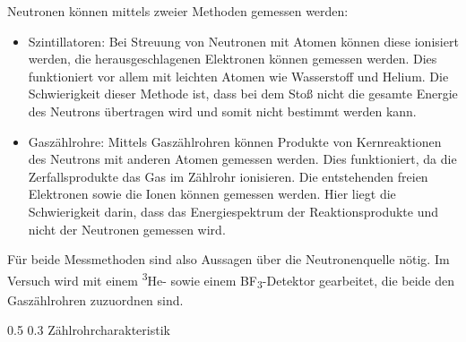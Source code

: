 \documentclass[german, %
parskip=full, %
bibliography=totoc, %
]{scrartcl}
\makeatletter
\renewcommand\subsection{\@startsection 
   {subsection}{2}{0mm}%
   {0.5\baselineskip}%
   {0.3\baselineskip}%
   {\bfseries\sffamily\large}%
   }
\makeatother
\begin{document}
Neutronen können mittels zweier Methoden gemessen werden:
\begin{itemize}
\item	Szintillatoren: Bei Streuung von Neutronen mit Atomen können diese ionisiert werden, die herausgeschlagenen Elektronen können gemessen werden. Dies funktioniert vor allem mit leichten Atomen wie Wasserstoff und Helium. Die Schwierigkeit dieser Methode ist, dass bei dem Stoß nicht die gesamte Energie des Neutrons übertragen wird und somit nicht bestimmt werden kann.
\item	Gaszählrohre: Mittels Gaszählrohren können Produkte von Kernreaktionen des Neutrons mit anderen Atomen gemessen werden. Dies funktioniert, da die Zerfallsprodukte das Gas im Zählrohr ionisieren. Die entstehenden freien Elektronen sowie die Ionen können gemessen werden. Hier liegt die Schwierigkeit darin, dass das Energiespektrum der Reaktionsprodukte und nicht der Neutronen gemessen wird.
\end{itemize}
Für beide Messmethoden sind also Aussagen über die Neutronenquelle nötig. Im Versuch wird mit einem \textsuperscript{3}He- sowie einem BF\textsubscript{3}-Detektor gearbeitet, die beide den Gaszählrohren zuzuordnen sind.

\subsection{Zählrohrcharakteristik}
\end{document}
